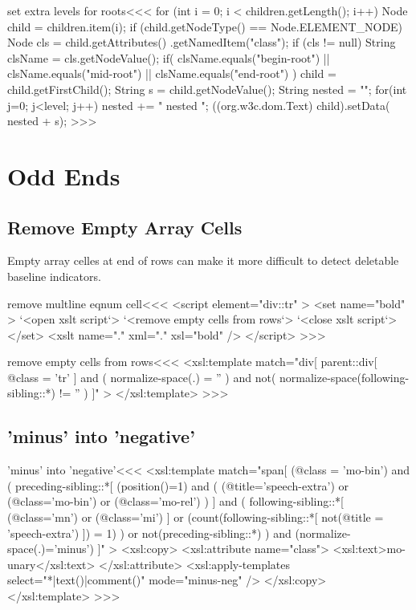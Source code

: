 \documentclass{article}
\begin{document}
\<set extra levels for roots\><<<
for (int i = 0; i < children.getLength(); i++) {
  Node child = children.item(i);
  if (child.getNodeType() == Node.ELEMENT_NODE) {
    Node cls = child.getAttributes()
                    .getNamedItem("class");
    if (cls != null) {
      String clsName = cls.getNodeValue();
      if( clsName.equals("begin-root") 
          || clsName.equals("mid-root") 
          || clsName.equals("end-root") 
      ){
         child = child.getFirstChild();
         String s = child.getNodeValue();
         String nested = "";
         for(int j=0; j<level; j++){ 
            nested += " nested ";
         }
         ((org.w3c.dom.Text) child).setData( nested + s);
} } } }
>>>



\section{Odd Ends}

\subsection{Remove Empty Array Cells}

Empty array celles at end of rows can make it more difficult to 
detect deletable baseline indicators.



\<remove multline eqnum cell\><<<
<script element="div::tr" >
  <set name="bold" >
     `<open xslt script`>
     `<remove empty cells from rows`> 
     `<close xslt script`>
  </set>
  <xslt name="." xml="." xsl="bold" />
</script> 
>>>

\<remove empty cells from rows\><<<
<xsl:template match="div[ 
    parent::div[ @class = 'tr' ]
    and ( normalize-space(.) = '' )
    and not( normalize-space(following-sibling::*) != '' )
]" >
</xsl:template> 
>>>





\subsection{'minus' into 'negative'}



\<'minus' into 'negative'\><<<
<xsl:template match="span[
    (@class = 'mo-bin')
  and
    (   preceding-sibling::*[
           (position()=1) 
           and 
           ( (@title='speech-extra') 
             or (@class='mo-bin') 
             or (@class='mo-rel')  )
        ]
        and 
        (
           following-sibling::*[ (@class='mn') or (@class='mi') ]
          or
           (count(following-sibling::*[
               not(@title = 'speech-extra')
            ]) = 1)
        )
      or
        not(preceding-sibling::*)
    )
  and
    (normalize-space(.)='minus')
]" >
  <xsl:copy>
    <xsl:attribute name="class">
       <xsl:text>mo-unary</xsl:text>
    </xsl:attribute>
    <xsl:apply-templates select="*|text()|comment()" 
                         mode="minus-neg" />
  </xsl:copy>
</xsl:template> 
>>>
\end{document}

